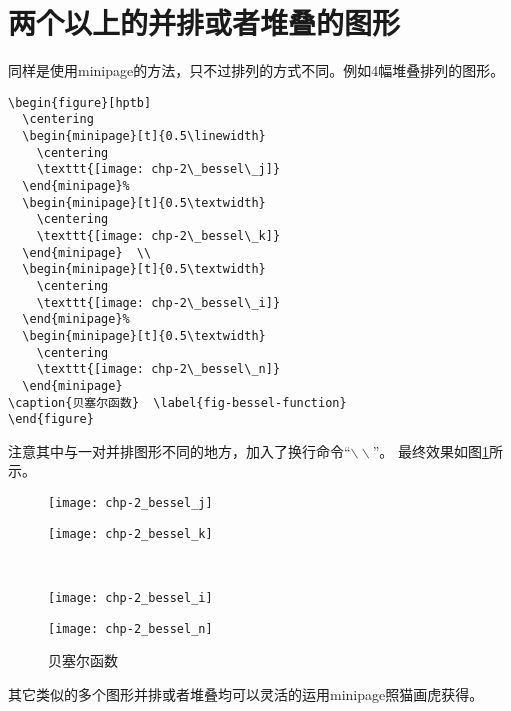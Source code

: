 \section{两个以上的并排或者堆叠的图形}
同样是使用minipage的方法，只不过排列的方式不同。例如4幅堆叠排列的图形。
\begin{verbatim}
\begin{figure}[hptb]
  \centering
  \begin{minipage}[t]{0.5\linewidth}
    \centering
    \texttt{[image: chp-2\_bessel\_j]}
  \end{minipage}%
  \begin{minipage}[t]{0.5\textwidth}
    \centering
    \texttt{[image: chp-2\_bessel\_k]}
  \end{minipage}  \\
  \begin{minipage}[t]{0.5\textwidth}
    \centering
    \texttt{[image: chp-2\_bessel\_i]}
  \end{minipage}%
  \begin{minipage}[t]{0.5\textwidth}
    \centering
    \texttt{[image: chp-2\_bessel\_n]}
  \end{minipage}
\caption{贝塞尔函数}  \label{fig-bessel-function}
\end{figure}
\end{verbatim}
注意其中与一对并排图形不同的地方，加入了换行命令“$\backslash\backslash$”。
最终效果如图\ref{fig-bessel-function}所示。
\begin{figure}[hptb]
  \centering
  \begin{minipage}[t]{0.5\linewidth}
    \centering
    \texttt{[image: chp-2\_bessel\_j]}
  \end{minipage}%
  \begin{minipage}[t]{0.5\textwidth}
    \centering
    \texttt{[image: chp-2\_bessel\_k]}
  \end{minipage}  \\
  \begin{minipage}[t]{0.5\textwidth}
    \centering
    \texttt{[image: chp-2\_bessel\_i]}
  \end{minipage}%
  \begin{minipage}[t]{0.5\textwidth}
    \centering
    \texttt{[image: chp-2\_bessel\_n]}
  \end{minipage}
\caption{贝塞尔函数}  \label{fig-bessel-function}
\end{figure}
其它类似的多个图形并排或者堆叠均可以灵活的运用minipage照猫画虎获得。

